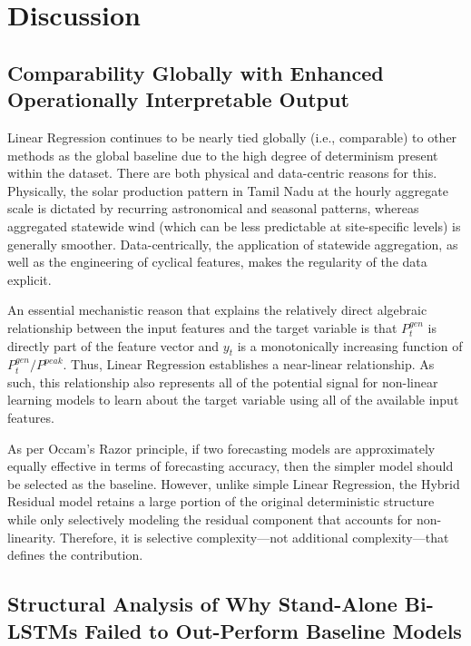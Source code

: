 \documentclass{ieeeaccess}
\begin{document}
\section{Discussion}

\subsection{Comparability Globally with Enhanced Operationally Interpretable Output}

Linear Regression continues to be nearly tied globally (i.e., comparable) to other methods as the global baseline due to the high degree of determinism present within the dataset. There are both physical and data-centric reasons for this. Physically, the solar production pattern in Tamil Nadu at the hourly aggregate scale is dictated by recurring astronomical and seasonal patterns, whereas aggregated statewide wind (which can be less predictable at site-specific levels) is generally smoother. Data-centrically, the application of statewide aggregation, as well as the engineering of cyclical features, makes the regularity of the data explicit.

An essential mechanistic reason that explains the relatively direct algebraic relationship between the input features and the target variable is that $P^{gen}_{t}$ is directly part of the feature vector and $y_{t}$ is a monotonically increasing function of $P^{gen}_{t}/P^{peak}$. Thus, Linear Regression establishes a near-linear relationship. As such, this relationship also represents all of the potential signal for non-linear learning models to learn about the target variable using all of the available input features.

As per Occam's Razor principle, if two forecasting models are approximately equally effective in terms of forecasting accuracy, then the simpler model should be selected as the baseline. However, unlike simple Linear Regression, the Hybrid Residual model retains a large portion of the original deterministic structure while only selectively modeling the residual component that accounts for non-linearity. Therefore, it is selective complexity---not additional complexity---that defines the contribution.

\subsection{Structural Analysis of Why Stand-Alone Bi-LSTMs Failed to Out-Perform Baseline Models}
\end{document}
